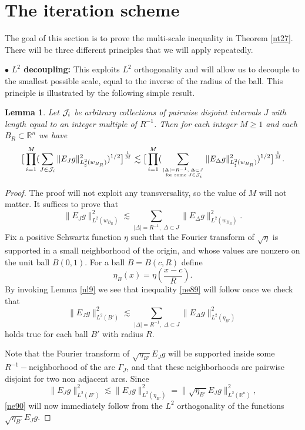\documentclass[amssymb,amsfonts,12pt]{amsart}
\newtheorem{lemma}[theorem]{Lemma}
\def\R{{\mathbb R}}
\begin{document}
\section{The iteration scheme}
The goal of this section is to prove the multi-scale inequality in Theorem \ref{nt27}. There will be three different principles that we will apply repeatedly.
\medskip

$\bullet$ \textbf{$L^2$ decoupling:} This exploits $L^2$ orthogonality and will allow us to decouple to the smallest possible scale, equal to the inverse of the radius of the ball. This principle is illustrated by the following simple result.
\begin{lemma}
\label{nl3}
Let ${\mathcal J}_i$ be arbitrary collections of pairwise disjoint intervals $J$ with length equal to an integer multiple of  $R^{-1}$. Then for each integer $M\ge 1$ and each $B_R\subset\R^n$ we have
$$\big[\prod_{i=1}^{M}(\sum_{J\in {\mathcal J}_i}\|E_{J}g\|_{L^2_\sharp(w_{B_R})}^2)^{1/2}\big]^{\frac1{M}}\lesssim \big[\prod_{i=1}^{M}(\sum_{|\Delta|=R^{-1},\;\Delta\subset J\atop{\text{ for some }J\in{\mathcal J}_i}}\|E_{\Delta}g\|_{L^2_\sharp(w_{B_R})}^2)^{1/2}\big]^{\frac1{M}}.$$
\end{lemma}

\begin{proof}
The proof will not exploit any transversality, so the value of $M$ will not matter.
It suffices to prove that
\begin{equation}
\label{ne89}
\|E_{J}g\|_{L^2(w_{B_R})}^2\lesssim \sum_{|\Delta|=R^{-1},\;\Delta\subset J}\|E_{\Delta}g\|_{L^2(w_{B_R})}^2.
\end{equation}
Fix   a positive Schwartz function $\eta$ such that the Fourier transform of $\sqrt{\eta}$ is supported in a small neighborhood of the origin, and whose values are nonzero on the unit ball $B(0,1)$. For a ball $B=B(c,R)$ define
$$\eta_B(x)=\eta(\frac{x-c}{R}).$$
By invoking Lemma \ref{nl9} we see that inequality \eqref{ne89} will follow once we check that
\begin{equation}
\label{ne90}
\|E_{J}g\|_{L^2({B'})}^2\lesssim \sum_{|\Delta|=R^{-1},\;\Delta\subset J}\|E_{\Delta}g\|_{L^2(\eta_{B'})}^2
\end{equation}
holds true for each ball $B'$ with radius $R$.


Note that the Fourier transform of $\sqrt{\eta_{B'}}E_{J}g$ will be supported inside some $R^{-1}-$neighborhood of the arc $\Gamma_J$, and that these neighborhoods are pairwise disjoint for two non adjacent arcs. Since
$$\|E_{J}g\|_{L^2({B'})}^2\lesssim \|E_{J}g\|_{L^2(\eta_{B'})}^2=\|\sqrt{\eta_{B'}}E_{J}g\|_{L^2(\R^n)}^2,$$
\eqref{ne90} will now immediately follow from the $L^2$ orthogonality of the functions $\sqrt{\eta_{B'}}E_{J}g$.


\end{proof}
\medskip
\end{document}
